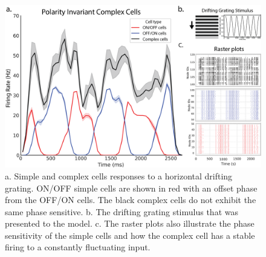 \documentclass[12pt]{article}
\begin{document}
\begin{figure}[H]
    \centering
    \includegraphics[width=1 \textwidth]{figures/complex_invariance_figure.png}
    \caption{a. Simple and complex cells responses to a horizontal drifting grating. ON/OFF simple cells are shown in red with an offset phase from the OFF/ON cells. The black complex cells do not exhibit the same phase sensitive. b. The drifting grating stimulus that was presented to the model. c. The raster plots also illustrate the phase sensitivity of the simple cells and how the complex cell has a stable firing to a constantly fluctuating input.}
    \label{fig:polarity invariance}
\end{figure}
\end{document}
